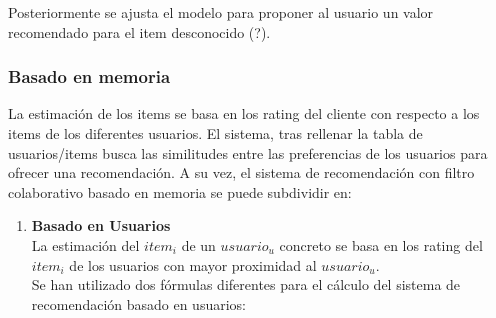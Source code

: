 Posteriormente se ajusta el modelo para proponer al usuario un valor recomendado para el item desconocido (?).
\subsubsection{Basado en memoria}
La estimación de los items se basa en los rating del cliente con respecto a los items de los diferentes usuarios. El sistema, tras rellenar la tabla de usuarios/items busca las similitudes entre las preferencias de los usuarios para ofrecer una recomendación. 
A su vez, el sistema de recomendación con filtro colaborativo basado en memoria se puede subdividir en: 
\begin{enumerate}

\item  \textbf{Basado en Usuarios}\\ La estimación del  $item_{i}$ de un $usuario_{u}$ concreto se basa en los rating del $item_{i}$  de los usuarios  con mayor proximidad al $usuario_{u}$. \\Se han utilizado dos fórmulas diferentes para el cálculo del sistema de recomendación basado en usuarios: \\ \begin{itemize}


\end{itemize}
\end{enumerate}
